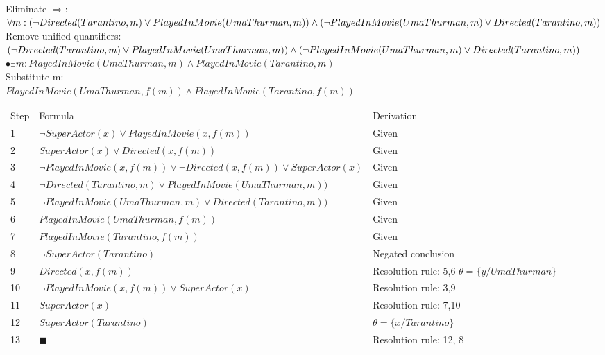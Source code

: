 \documentclass[paper=a4, fontsize=11pt]{scrartcl} %
\numberwithin{equation}{section} %
\numberwithin{figure}{section} %
\numberwithin{table}{section} %
\begin{document}
\begin{enumerate}
\begin{enumerate}
			Eliminate $\Rightarrow$:\\
			$\forall m: (\neg Directed(Tarantino,m) \vee PlayedInMovie(UmaThurman,m)) \wedge \\
			 (\neg PlayedInMovie(UmaThurman,m) \vee Directed(Tarantino,m))$\\
			
			Remove unified quantifiers:\\
			$(\neg Directed(Tarantino,m) \vee PlayedInMovie(UmaThurman,m)) \wedge \\
			(\neg PlayedInMovie(UmaThurman,m) \vee Directed(Tarantino,m))$\\

			
			$\bullet \exists m: PlayedInMovie(UmaThurman,m) \wedge PlayedInMovie(Tarantino,m)$\\
		
			Substitute m:\\
			$PlayedInMovie(UmaThurman,f(m)) \wedge PlayedInMovie(Tarantino,f(m))$\\

		\begin{table}[h]
			\begin{tabular}{lll}
				Step & Formula                     							& Derivation         \\
				1   & $\neg SuperActor(x) \vee PlayedInMovie(x,f(m))$  		& Given              \\
				2   & $SuperActor(x) \vee Directed(x,f(m))$             	& Given              \\
				3   & $\neg PlayedInMovie(x,f(m)) \vee \neg Directed(x,f(m)) \vee SuperActor(x)$   & Given              \\
				4   & $\neg Directed(Tarantino,m) \vee PlayedInMovie(UmaThurman,m))$         & Given              \\
				5   & $\neg PlayedInMovie(UmaThurman,m) \vee Directed(Tarantino,m))$			& Given              \\
				6   & $PlayedInMovie(UmaThurman,f(m))$                    	& Given \\
				7   & $PlayedInMovie(Tarantino,f(m))$             			& Given\\
				8   & $\neg SuperActor(Tarantino)$                    		& Negated conclusion\\
				\hline
				9   & $Directed(x, f(m))$    								& \makecell{Resolution rule: 5,6\\$\theta = \{y/UmaThurman\}$}\\
				10  & $\neg PlayedInMovie(x,f(m)) \vee SuperActor(x)$      	& Resolution rule: 3,9\\
				11  & $SuperActor(x)$										& Resolution rule: 7,10\\ 		      					
				12 	& $SuperActor(Tarantino)$								& $\theta = \{x/Tarantino\}$ \\
				13	& $\blacksquare$           								& Resolution rule: 12, 8
			\end{tabular}
	\end{table}


\end{enumerate}
\end{enumerate}
\end{document}
